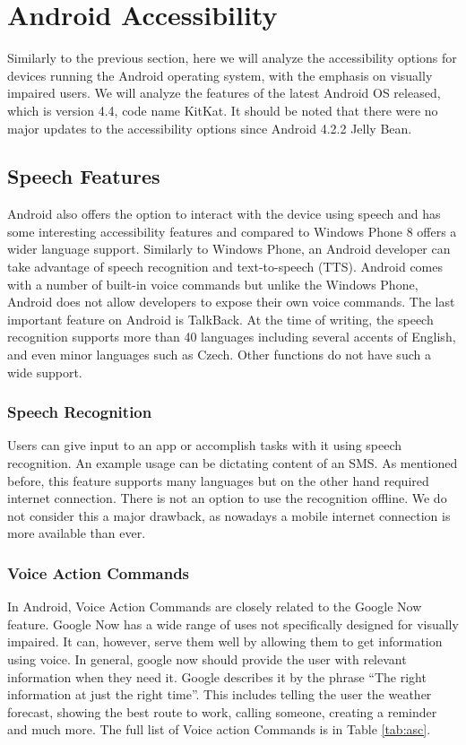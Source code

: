 \section{Android Accessibility}
Similarly to the previous section, here we will analyze the accessibility options for devices running the Android operating system, with the emphasis on visually impaired users. We will analyze the features of the latest Android OS released, which is version 4.4, code name KitKat. It should be noted that there were no major updates to the accessibility options since Android 4.2.2 Jelly Bean.
\subsection{Speech Features}
Android also offers the option to interact with the device using speech and has some interesting accessibility features and compared to Windows Phone 8 offers a wider language support. Similarly to Windows Phone, an Android developer can take advantage of speech recognition and text-to-speech (TTS). Android comes with a number of built-in voice commands but unlike the Windows Phone, Android does not allow developers to expose their own voice commands. The last important feature on Android is TalkBack.
At the time of writing, the speech recognition supports more than 40 languages including several accents of English, and even minor languages such as Czech. Other functions do not have such a wide support. 
\subsubsection{Speech Recognition}
Users can give input to an app or accomplish tasks with it using speech recognition. An example usage can be dictating content of an SMS. As mentioned before, this feature supports many languages but on the other hand required internet connection. There is not an option to use the recognition offline. We do not consider this a major drawback, as nowadays a mobile internet connection is more available than ever.
\subsubsection{Voice Action Commands}
In Android, Voice Action Commands are closely related to the Google Now feature. Google Now has a wide range of uses not specifically designed for visually impaired. It can, however, serve them well by allowing them to get information using voice.
In general, google now should provide the user with relevant information when they need it. Google describes it by the phrase “The right information at just the right time”. This includes telling the user the weather forecast, showing the best route to work, calling someone, creating a reminder and much more. The full list of Voice action Commands is in Table \ref{tab:asc}.

